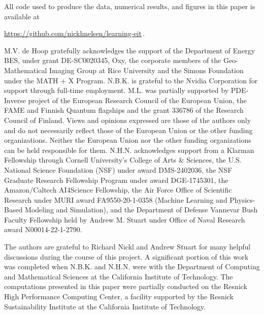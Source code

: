 \documentclass[pdflatex,sn-mathphys-num]{sn-jnl-preprint}
\theoremstyle{thmstyleone}%
\theoremstyle{thmstyletwo}%
\theoremstyle{thmstylethree}%
\numberwithin{equation}{section}
\numberwithin{theorem}{section}
\begin{document}
\backmatter

All code used to produce the data, numerical results, and figures in this paper is available at
\begin{center}
    \url{https://github.com/nickhnelsen/learning-eit}\,.
\end{center}

M.V. de Hoop gratefully acknowledges the support of the Department of Energy BES, under grant DE-SC0020345, Oxy, the corporate members of the Geo-Mathematical Imaging Group at Rice University and the Simons Foundation under the MATH + X Program.
N.B.K. is grateful to the Nvidia Corporation for support through full-time employment. 
M.L. was partially supported by PDE-Inverse project of the European Research Council of the European Union, the FAME and Finnish Quantum flagships and the grant 336786 of the Research Council of Finland. Views and opinions expressed are those of the authors only and do not necessarily reflect those of the European Union or the other funding organizations. Neither the European Union nor the other funding organizations can be held responsible for them.
N.H.N. acknowledges support from a Klarman Fellowship through Cornell University's College of Arts \& Sciences, the U.S. National Science Foundation (NSF) under award DMS-2402036, the NSF Graduate Research Fellowship Program under award DGE-1745301, the
Amazon/Caltech AI4Science Fellowship, the Air Force Office of Scientific Research under MURI award FA9550-20-1-0358 (Machine Learning and Physics-Based Modeling and Simulation), and the Department of Defense Vannevar Bush Faculty Fellowship held by Andrew M. Stuart under Office of Naval Research award N00014-22-1-2790. 

The authors are grateful to Richard Nickl and Andrew Stuart for many helpful discussions during the course of this project. A significant portion of this work was completed when N.B.K. and N.H.N. were with the Department of Computing and Mathematical Sciences at the California Institute of Technology. The computations presented in this paper were partially conducted on the Resnick High
Performance Computing Center, a facility supported by the Resnick Sustainability Institute at the California Institute of Technology.

\appendix
\end{document}

